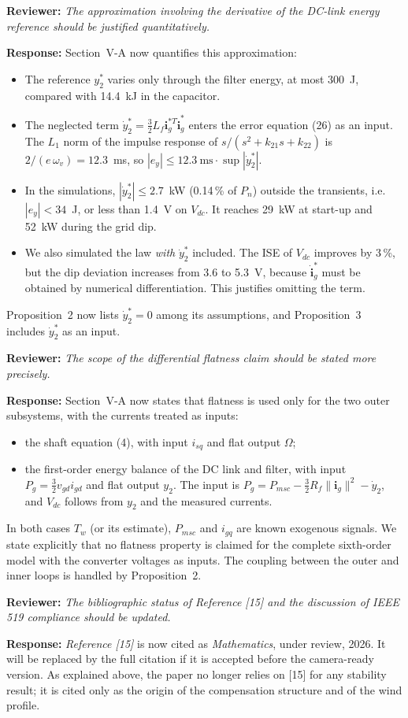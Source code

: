 \documentclass[11pt,a4paper]{article}
\newcommand{\rev}[1]{\par\medskip\noindent\textbf{Reviewer:} \emph{#1}\par\smallskip\noindent\textbf{Response:} }
\begin{document}
\rev{The approximation involving the derivative of the DC-link energy reference should be justified quantitatively.}
Section~V-A now quantifies this approximation:
\begin{itemize}
\item The reference $y_2^*$ varies only through the filter energy, at most 300~J, compared with
14.4~kJ in the capacitor.
\item The neglected term $\dot y_2^*=\frac32L_f\mathbf i_g^{*T}\dot{\mathbf i}_g^*$ enters the error
equation (26) as an input. The $L_1$ norm of the impulse response of $s/(s^2+k_{21}s+k_{22})$ is
$2/(e\,\omega_v)=12.3$~ms, so $|e_y|\le12.3~\text{ms}\cdot\sup|\dot y_2^*|$.
\item In the simulations, $|\dot y_2^*|\le2.7$~kW (0.14\,\% of $P_n$) outside the transients, i.e.
$|e_y|<34$~J, or less than 1.4~V on $V_{dc}$. It reaches 29~kW at start-up and 52~kW during the grid dip.
\item We also simulated the law \emph{with} $\dot y_2^*$ included. The ISE of $V_{dc}$ improves by 3\,\%,
but the dip deviation increases from 3.6 to 5.3~V, because $\dot{\mathbf i}_g^*$ must be obtained by
numerical differentiation. This justifies omitting the term.
\end{itemize}
Proposition~2 now lists $\dot y_2^*=0$ among its assumptions, and Proposition~3 includes $\dot y_2^*$ as an input.

\rev{The scope of the differential flatness claim should be stated more precisely.}
Section~V-A now states that flatness is used only for the two outer subsystems, with the currents
treated as inputs:
\begin{itemize}
\item the shaft equation (4), with input $i_{sq}$ and flat output $\Omega$;
\item the first-order energy balance of the DC link and filter, with input $P_g=\frac32v_{gd}i_{gd}$ and
flat output $y_2$. The input is $P_g=P_{msc}-\frac32R_f\|\mathbf i_g\|^2-\dot y_2$, and $V_{dc}$ follows
from $y_2$ and the measured currents.
\end{itemize}
In both cases $T_w$ (or its estimate), $P_{msc}$ and $i_{gq}$ are known exogenous signals. We state
explicitly that no flatness property is claimed for the complete sixth-order model with the converter
voltages as inputs. The coupling between the outer and inner loops is handled by Proposition~2.

\rev{The bibliographic status of Reference [15] and the discussion of IEEE 519 compliance should be updated.}
\emph{Reference [15]} is now cited as \emph{Mathematics}, under review, 2026. It will be replaced by
the full citation if it is accepted before the camera-ready version. As explained above, the
paper no longer relies on [15] for any stability result; it is cited only as the origin of the
compensation structure and of the wind profile.
\end{document}
